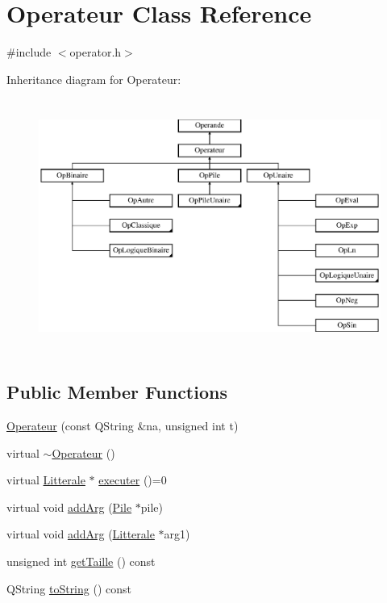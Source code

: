 \hypertarget{class_operateur}{}\section{Operateur Class Reference}
\label{class_operateur}


{\ttfamily \#include $<$operator.\+h$>$}

Inheritance diagram for Operateur\+:\begin{figure}[H]
\begin{center}
\leavevmode
\includegraphics[height=8.330579cm]{class_operateur}
\end{center}
\end{figure}
\subsection*{Public Member Functions}
\begin{DoxyCompactItemize}
\item 
\hyperlink{class_operateur_ad30f42803cab7fbffe07d6b6a3723ee2}{Operateur} (const Q\+String \&na, unsigned int t)
\item 
virtual \hyperlink{class_operateur_a6cf041d43e1cde240783492fc887a54a}{$\sim$\+Operateur} ()
\item 
virtual \hyperlink{class_litterale}{Litterale} $\ast$ \hyperlink{class_operateur_a875ee3c8ad2284fd8537c32070d059d2}{executer} ()=0
\item 
virtual void \hyperlink{class_operateur_ae9b209c3a9f55eb3b3821f43fe437105}{add\+Arg} (\hyperlink{class_pile}{Pile} $\ast$pile)
\item 
virtual void \hyperlink{class_operateur_ae39d95062e174881d250561617cf7a6a}{add\+Arg} (\hyperlink{class_litterale}{Litterale} $\ast$arg1)
\item 
unsigned int \hyperlink{class_operateur_a850af30f5bd589fb9c3f10b9dbc03f73}{get\+Taille} () const 
\item 
Q\+String \hyperlink{class_operateur_ad49ae9c67adcd3af3a9be0e2bc13c629}{to\+String} () const 
\end{DoxyCompactItemize}

